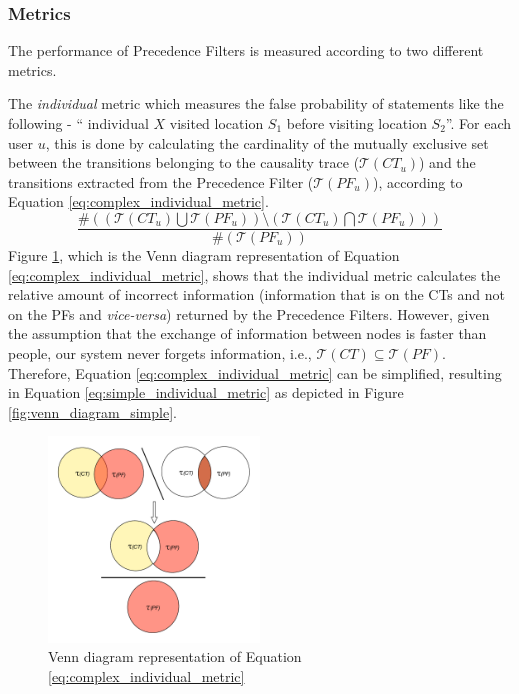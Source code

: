 \subsubsection{Metrics}

The performance of Precedence Filters is measured according to two
different metrics.

The \emph{individual} metric which measures the
false probability of statements like the following - ``
individual $X$ visited location $S_1$ before visiting location
$S_2$''. For each user $u$, this is done by calculating the cardinality of the mutually
exclusive set between the transitions belonging to the causality trace
($\mathcal{T}(CT_u)$) and the transitions extracted from the Precedence Filter
($\mathcal{T}(PF_u)$), according to Equation \ref{eq:complex_individual_metric}.
 \begin{equation}
   \label{eq:complex_individual_metric}
   \frac{\# ( (\mathcal{T}(CT_u) \bigcup \mathcal{T}(PF_u) )
       \setminus (\mathcal{T}(CT_u) \bigcap \mathcal{T}(PF_u) ) )}
     {\#(\mathcal{T}(PF_u))}
 \end{equation}
 Figure \ref{fig:venn_diagram_complex}, which is the Venn diagram
 representation of Equation \ref{eq:complex_individual_metric}, shows
 that the individual metric calculates the relative amount of
 incorrect information (information that is on the CTs and not on the
 PFs and \textit{vice-versa}) returned by the Precedence
 Filters. However, given the assumption that the exchange of
 information between nodes is faster than people, our system never
 forgets information, i.e., $\mathcal{T}(CT) \subseteq
 \mathcal{T}(PF)$. Therefore, Equation
 \ref{eq:complex_individual_metric} can be simplified, resulting in
 Equation \ref{eq:simple_individual_metric} as depicted in Figure
 \ref{fig:venn_diagram_simple}.

\begin{figure}
  \centering
  \includegraphics[width=0.50\textwidth]{images/venn_diagrams_complex.pdf}
  \caption{Venn diagram representation of Equation \ref{eq:complex_individual_metric}}
  \label{fig:venn_diagram_complex}
\end{figure}

